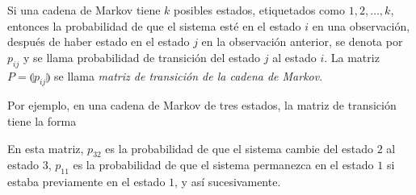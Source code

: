 \begin{definition}
    Si una cadena de Markov tiene $k$ posibles estados, etiquetados como $1, 2, \ldots, k$, entonces la probabilidad de que el sistema esté en el estado $i$ en una observación, después de haber estado en el estado $j$ en la observación anterior, se denota por $p_{ij}$ y se llama probabilidad de transición del estado $j$ al estado $i$. La matriz $P = \llparenthesis p_{ij} \rrparenthesis$ se llama \emph{matriz de transición de la cadena de Markov}.
\end{definition}

Por ejemplo, en una cadena de Markov de tres estados, la matriz de transición tiene la forma\\
\begin{nscenter}
\end{nscenter}
En esta matriz, $p_{32}$ es la probabilidad de que el sistema cambie del estado $2$ al estado $3$, $p_{11}$ es la probabilidad de que el sistema permanezca en el estado $1$ si estaba previamente en el estado $1$, y así sucesivamente.

